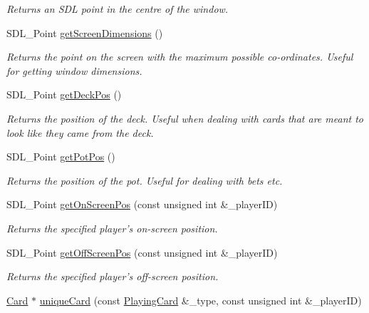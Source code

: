 \begin{DoxyCompactItemize}
\begin{DoxyCompactList}\small\item\em Returns an S\-D\-L point in the centre of the window. \end{DoxyCompactList}\item 
S\-D\-L\-\_\-\-Point \hyperlink{classGUI_1_1DealerGUI_ae76232120276a60eb6d537986426cd6b}{get\-Screen\-Dimensions} ()
\begin{DoxyCompactList}\small\item\em Returns the point on the screen with the maximum possible co-\/ordinates. Useful for getting window dimensions. \end{DoxyCompactList}\item 
S\-D\-L\-\_\-\-Point \hyperlink{classGUI_1_1DealerGUI_a2e6c084b0613baec0805981c66977e7e}{get\-Deck\-Pos} ()
\begin{DoxyCompactList}\small\item\em Returns the position of the deck. Useful when dealing with cards that are meant to look like they came from the deck. \end{DoxyCompactList}\item 
S\-D\-L\-\_\-\-Point \hyperlink{classGUI_1_1DealerGUI_ada2eefeb414c1c436265ac4b8c9f6856}{get\-Pot\-Pos} ()
\begin{DoxyCompactList}\small\item\em Returns the position of the pot. Useful for dealing with bets etc. \end{DoxyCompactList}\item 
S\-D\-L\-\_\-\-Point \hyperlink{classGUI_1_1DealerGUI_a1703289b59952a99d90b746f050d09ae}{get\-On\-Screen\-Pos} (const unsigned int \&\-\_\-player\-I\-D)
\begin{DoxyCompactList}\small\item\em Returns the specified player's on-\/screen position. \end{DoxyCompactList}\item 
S\-D\-L\-\_\-\-Point \hyperlink{classGUI_1_1DealerGUI_ab7fb3219f9300b4f5f59dc5a81d94135}{get\-Off\-Screen\-Pos} (const unsigned int \&\-\_\-player\-I\-D)
\begin{DoxyCompactList}\small\item\em Returns the specified player's off-\/screen position. \end{DoxyCompactList}\item 
\hyperlink{classGUI_1_1Card}{Card} $\ast$ \hyperlink{classGUI_1_1DealerGUI_a14ed5f077dbaff37129aeb3004378ebd}{unique\-Card} (const \hyperlink{classPlayingCard}{Playing\-Card} \&\-\_\-type, const unsigned int \&\-\_\-player\-I\-D)

\end{DoxyCompactItemize}
